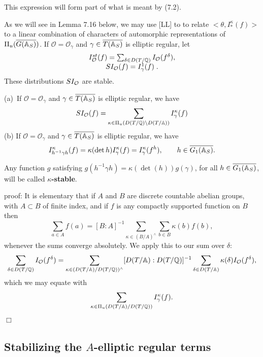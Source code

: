 This expression will form part of what is meant by (7.2).

As we will see in Lemma 7.16 below,
we may use [LL] to to relate $<\theta,I_{*}^\kappa (f)>$ to
a linear combination of characters of automorphic representations of
$\Pi_u(\overline{G(\mathbb{A} _S)})$. If $\mathcal{O}=\mathcal{O}_\gamma $
and $\gamma \in \overline{T(\mathbb{A} _S)}$ is elliptic regular, let 
\begin{equation}
\begin{array}{c}
I^{st}_{\cal{O}}(f)=\sum_{\delta\in D(T/\mathbb{Q} )}
I_{\cal{O}}(f^\delta),\\
SI_{\cal{O}}(f)=I^1_{\gamma}(f)\; .
\end{array}
\end{equation}
These distributions $SI_{\cal{O}}$ are stable.

\begin{lemma}
(a)\ If $\mathcal{O}=\mathcal{O}_\gamma $ and
$\gamma \in \overline{T(\mathbb{A} _S)}$ is
elliptic regular, we have 
\[
SI_{\mathcal{O}}(f)
=\sum_{\kappa \in \Pi _u(D(T/{\mathbb Q})\backslash D(T/\mathbb{A} ))}
I_\gamma ^\kappa (f)
\]
(b) If $\mathcal{O}=\mathcal{O}_\gamma $ and
$\gamma \in \overline{T(\mathbb{A} _S)}$ is elliptic regular, we have 
\[
I_{h^{-1}\gamma h}^\kappa (f)=\kappa (\det h)I_\gamma ^\kappa (f)=I_\gamma
^\kappa (f^h),\ \ \ \ \ \ h\in \overline{G_1(\mathbb{A} _S)}.
\]
\end{lemma}

Any function $g$ satisfying $g(h^{-1}\gamma h)=\kappa (\det (h))g(\gamma )$,
for all $h\in \overline{G_1(\mathbb{A} _S)}$, will be called
\textbf{$\kappa $-stable}.

proof: It is elementary that if $A$ and $B$ are
discrete countable abelian groups, with $A\subset B$ of finite
index, and if $f$ is any compactly supported function on $B$ then 
\begin{equation}
\sum_{a\in A}f(a)=[B:A]^{-1}\sum_{\kappa \in (B/A)^{\wedge }}\sum_{b\in
B}\kappa (b)f(b),
\end{equation}
whenever the sums converge absolutely. We apply this to our sum over $\delta 
$: 
\[
\sum_{\delta \in D(T/\mathbb{Q} )}
I_{\cal{O}}(f^\delta)
=
\sum_{\kappa \in (D(T/\mathbb{A} )/D(T/\mathbb{Q} ))^{\wedge}}
[D(T/\mathbb{A} ):D(T/\mathbb{Q} )]^{-1}
\sum_{\delta \in D(T/\mathbb{A} )}
\kappa (\delta )I_{\cal{O}}(f^\delta),
\]
which we may equate with
\begin{equation}
\sum_{\kappa \in \Pi_u(D(T/\mathbb{A} )/D(T/\mathbb{Q} ))}
I^\kappa_\gamma (f).
\end{equation}
$\Box$

\subsection{Stabilizing the $A$-elliptic regular terms}

